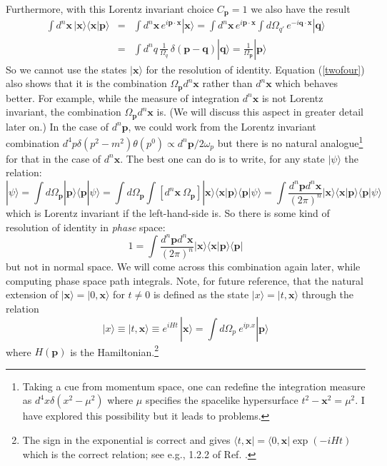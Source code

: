\documentclass{article}
\def\ket#1{|#1\rangle}                    %
\def\bra#1{\langle #1|}                   %
\def\amp#1#2{\langle #1 | #2\rangle}      %
\begin{document}
Furthermore, with this  Lorentz invariant choice $C_{\bm{p}}=1$ we also have the result
\begin{eqnarray}
 \int d^n \bm{x} \, \ket{\bm{x}}\amp{\bm{x}}{\bm{p}} &=& \int d^n \bm{x} \, e^{i\bm{p \cdot x}} \ket{\bm{x}}
 =\int d^n \bm{x} \,e^{i\bm{p \cdot x}}\int d\Omega_{q'} \, e^{-i\bm{q \cdot x}} \ket{\bm{q}}\nonumber\\
 &=& \int d^n {q} \,\frac{1}{\Omega_q}\, \delta(\bm{p}-\bm{q})\ket{\bm{q}} = \frac{1}{\Omega_{\bm{p}}} \ket{\bm{p}}
 \label{twofour}
\end{eqnarray} 
So we cannot use the states $\ket{\bm{x}}$ for the resolution of identity.  Equation (\ref{twofour}) also shows that it is the combination $\Omega_{\bm{p}}d^n \bm{x}$ rather than 
$d^n \bm{x}$ which behaves better. For example, while 
 the measure of integration $d^n \bm{x}$ is not Lorentz invariant, the combination  $\Omega_{\bm{p}}d^n \bm{x}$ is. (We will discuss this aspect in greater detail later on.) In the case of $d^n \bm{p}$, we could work from the Lorentz invariant combination $d^4p \delta(p^2-m^2) \theta(p^0)\propto d^n \bm{p}/2\omega_p$ but there is no natural analogue\footnote{Taking a cue from momentum space, one can redefine the integration measure as $d^4x \delta(x^2-\mu^2)$ where $\mu$ specifies the spacelike hypersurface $t^2-\mathbf{x}^2=\mu^2$. I have explored this possibility \cite{tpun}  but it leads to problems.} for that in the case of $d^n \bm{x}$.  The best one can do is to write, for any state $\ket{\psi}$ the  relation:
\begin{equation}
 \ket{\psi}=\int d\Omega_{\bm{p}}\ket{\bm{p}}\amp{\bm{p}}{\psi}=\int d\Omega_{\bm{p}}\int [d^n \bm{x}\ \Omega_{\bm{p}}]\ket{\bm{x}}\amp{\bm{x}}{\bm{p}}\amp{\bm{p}}{\psi}
 =\int \frac{d^n \bm{p} d^n \bm{x}}{(2\pi)^n}\ket{\bm{x}}\amp{\bm{x}}{\bm{p}}\amp{\bm{p}}{\psi}
 \label{measure2}
 \end{equation} 
 which is Lorentz invariant if the left-hand-side is. 
So there is some kind of resolution of identity in \textit{phase} space:
\begin{equation}
1=\int \frac{d^n \bm{p} d^n \bm{x}}{(2\pi)^n}\ket{\bm{x}}\amp{\bm{x}}{\bm{p}}\bra{\bm{p}}
 \end{equation}
 but not in normal space.
We will come across this combination again later, while computing phase space path integrals.
Note, for future reference, that the natural extension of $\ket{\bm{x}} = \ket{0,\bm{x}}$ for $t\neq 0$  is defined as the state $\ket{x} = \ket{t,\bm{x}}$ through  
the relation 
\begin{equation}
\ket{x} \equiv  \ket{t,\bm{x}}\equiv e^{i Ht} \,\ket{\bm{x}} = \int d\Omega_p \ e^{i{p . x}} \ket{\bm{p}}
\label{nintynine}
\end{equation} 
  where $H(\bm{p})$ is the Hamiltonian.\footnote{The sign in the exponential is correct and gives $\bra{t,\bm{x}}=\bra{0,\bm{x}}\exp(-iHt)$ which is the correct relation; see e.g., 1.2.2 of Ref. \cite{tpqft}.}
\end{document}
